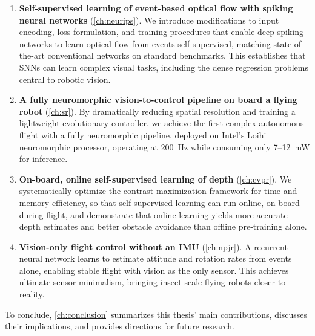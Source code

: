 \begin{enumerate}[leftmargin=*, topsep=4pt, itemsep=1pt, parsep=0pt]
    \item \textbf{Self-supervised learning of event-based optical flow with spiking neural networks} (\cref{ch:neurips}). We introduce modifications to input encoding, loss formulation, and training procedures that enable deep spiking networks to learn optical flow from events self-supervised, matching state-of-the-art conventional networks on standard benchmarks. This establishes that SNNs can learn complex visual tasks, including the dense regression problems central to robotic vision.
    \item \textbf{A fully neuromorphic vision-to-control pipeline on board a flying robot} (\cref{ch:sr}). By dramatically reducing spatial resolution and training a lightweight evolutionary controller, we achieve the first complex autonomous flight with a fully neuromorphic pipeline, deployed on Intel's Loihi neuromorphic processor, operating at 200~Hz while consuming only 7--12~mW for inference.
    \item \textbf{On-board, online self-supervised learning of depth} (\cref{ch:cvpr}). We systematically optimize the contrast maximization framework for time and memory efficiency, so that self-supervised learning can run online, on board during flight, and demonstrate that online learning yields more accurate depth estimates and better obstacle avoidance than offline pre-training alone.
    \item \textbf{Vision-only flight control without an IMU} (\cref{ch:npjr}). A recurrent neural network learns to estimate attitude and rotation rates from events alone, enabling stable flight with vision as the only sensor. This achieves ultimate sensor minimalism, bringing insect-scale flying robots closer to reality.
\end{enumerate}

To conclude, \cref{ch:conclusion} summarizes this thesis' main contributions, discusses their implications, and provides directions for future research.

